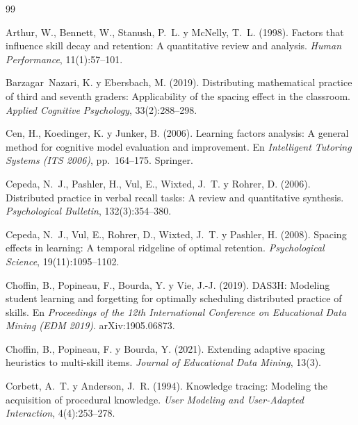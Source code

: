 \documentclass[11pt]{article}
\theoremstyle{definition}
\theoremstyle{remark}
\begin{document}
\begin{thebibliography}{99}
\small

Arthur, W., Bennett, W., Stanush, P.~L. y McNelly, T.~L. (1998).
\newblock Factors that influence skill decay and retention: A quantitative review and analysis.
\newblock \emph{Human Performance}, 11(1):57--101.

Barzagar~Nazari, K. y Ebersbach, M. (2019).
\newblock Distributing mathematical practice of third and seventh graders: Applicability of the spacing effect in the classroom.
\newblock \emph{Applied Cognitive Psychology}, 33(2):288--298.

Cen, H., Koedinger, K. y Junker, B. (2006).
\newblock Learning factors analysis: A general method for cognitive model evaluation and improvement.
\newblock En \emph{Intelligent Tutoring Systems (ITS 2006)}, pp.~164--175. Springer.

Cepeda, N.~J., Pashler, H., Vul, E., Wixted, J.~T. y Rohrer, D. (2006).
\newblock Distributed practice in verbal recall tasks: A review and quantitative synthesis.
\newblock \emph{Psychological Bulletin}, 132(3):354--380.

Cepeda, N.~J., Vul, E., Rohrer, D., Wixted, J.~T. y Pashler, H. (2008).
\newblock Spacing effects in learning: A temporal ridgeline of optimal retention.
\newblock \emph{Psychological Science}, 19(11):1095--1102.

Choffin, B., Popineau, F., Bourda, Y. y Vie, J.-J. (2019).
\newblock DAS3H: Modeling student learning and forgetting for optimally scheduling distributed practice of skills.
\newblock En \emph{Proceedings of the 12th International Conference on Educational Data Mining (EDM 2019)}. arXiv:1905.06873.

Choffin, B., Popineau, F. y Bourda, Y. (2021).
\newblock Extending adaptive spacing heuristics to multi-skill items.
\newblock \emph{Journal of Educational Data Mining}, 13(3).

Corbett, A.~T. y Anderson, J.~R. (1994).
\newblock Knowledge tracing: Modeling the acquisition of procedural knowledge.
\newblock \emph{User Modeling and User-Adapted Interaction}, 4(4):253--278.


\end{thebibliography}
\end{document}
